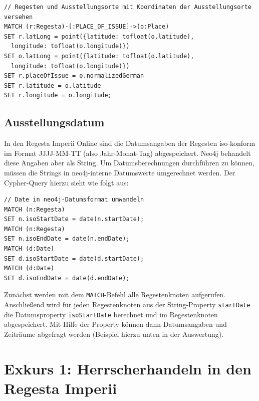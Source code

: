 \documentclass[ngerman,]{scrreprt}
\begin{document}
\begin{verbatim}
// Regesten und Ausstellungsorte mit Koordinaten der Ausstellungsorte versehen
MATCH (r:Regesta)-[:PLACE_OF_ISSUE]->(o:Place)
SET r.latLong = point({latitude: tofloat(o.latitude),
  longitude: tofloat(o.longitude)})
SET o.latLong = point({latitude: tofloat(o.latitude),
  longitude: tofloat(o.longitude)})
SET r.placeOfIssue = o.normalizedGerman
SET r.latitude = o.latitude
SET r.longitude = o.longitude;
\end{verbatim}

\hypertarget{ausstellungsdatum}{%
\subsection{Ausstellungsdatum}\label{ausstellungsdatum}}

In den Regesta Imperii Online sind die Datumsangaben der Regesten iso-konform im Format JJJJ-MM-TT (also Jahr-Monat-Tag) abgespeichert. Neo4j behandelt diese Angaben aber als String. Um Datumsberechnungen durchführen zu können, müssen die Strings in neo4j-interne Datumswerte umgerechnet werden. Der Cypher-Query hierzu sieht wie folgt aus:

\begin{verbatim}
// Date in neo4j-Datumsformat umwandeln
MATCH (n:Regesta)
SET n.isoStartDate = date(n.startDate);
MATCH (n:Regesta)
SET n.isoEndDate = date(n.endDate);
MATCH (d:Date)
SET d.isoStartDate = date(d.startDate);
MATCH (d:Date)
SET d.isoEndDate = date(d.endDate);
\end{verbatim}

Zunächst werden mit dem \texttt{MATCH}-Befehl alle Regestenknoten aufgerufen. Anschließend wird für jeden Regestenknoten aus der String-Property \texttt{startDate} die Datumsproperty \texttt{isoStartDate} berechnet und im Regestenknoten abgespeichert. Mit Hilfe der Property können dann Datumsangaben und Zeiträume abgefragt werden (Beispiel hierzu unten in der Auswertung).

\hypertarget{exkurs-1-herrscherhandeln-in-den-regesta-imperii}{%
\section{Exkurs 1: Herrscherhandeln in den Regesta Imperii}\label{exkurs-1-herrscherhandeln-in-den-regesta-imperii}}
\end{document}
